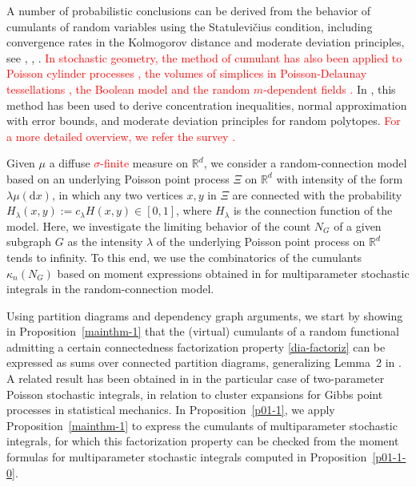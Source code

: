 \documentclass[12pt]{article}
\newcommand{\R}{\mathbb{R}}
\numberwithin{equation}{section}
\begin{document}
\medskip 

 A number of probabilistic conclusions can be derived
 from the behavior of cumulants of random variables using the 
Statulevi\v{c}ius condition, 
 including convergence rates in the Kolmogorov distance
 and moderate deviation principles, see
 \cite{saulis},
 \cite{doring},
 \cite{doering}. \textcolor{red}{In stochastic geometry, the method of cumulant has also been applied to Poisson cylinder processes \cite{heinrich09}, the volumes of simplices in Poisson-Delaunay tessellations \cite{thale21}, the Boolean model \cite{heinrich} and the random $m$-dependent fields \cite{gotze95}.} In \cite{grotethale18,thale18}, 
 this method has been used to derive concentration inequalities, normal approximation with error bounds, and moderate deviation principles for random polytopes. \textcolor{red}{For a more detailed overview, we refer the survey \cite{doering}.}
 
\medskip 
 
Given $\mu$ a %
diffuse \textcolor{red}{$\sigma$-finite} measure on $\R^d$,
 we consider a random-connection model
 based on an underlying Poisson point process $\Xi$ on $\R^d$
 with intensity of the form $\lambda\mu(\mathrm{d}x)$, in which 
 any two vertices $x,y$ in $\Xi$ are connected
 with the probability $H_\lambda(x,y):= c_\lambda H(x,y) \in [0,1]$,
 where $H_\lambda$ is the connection function of the model. 
 Here, we investigate the limiting behavior
 of the count $N_G$ of a given subgraph $G$
 as the intensity $\lambda$ of the underlying Poisson point process on $\R^d$
 tends to infinity. 
 To this end, we use the combinatorics of the cumulants $\kappa_n(N_G)$ 
 based on moment expressions obtained in \cite{prkhp} for
 multiparameter stochastic integrals in the random-connection model.
 
 \medskip 

Using partition diagrams and dependency graph arguments,
we start by showing in Proposition~\ref{mainthm-1}
that the (virtual) cumulants of a random functional admitting
a certain connectedness factorization property \eqref{dia-factoriz}  
can be expressed as sums over connected partition diagrams, 
 generalizing Lemma~2 in \cite{MalyshevMinlos91}.  
 A related result has been obtained in \cite{jansen}
 in the particular case of two-parameter Poisson stochastic
 integrals, in relation to 
 cluster expansions for Gibbs point processes in statistical
 mechanics. 
 In Proposition~\ref{p01-1}, we apply Proposition~\ref{mainthm-1} 
 to express the cumulants of multiparameter stochastic integrals,
 for which this factorization property can be checked from 
 the moment formulas for 
 multiparameter stochastic integrals computed in Proposition~\ref{p01-1-0}. 
 
\end{document}
